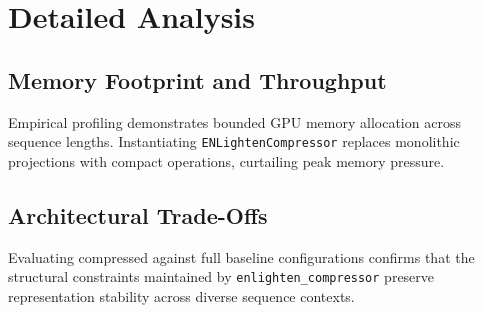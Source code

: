\section{Detailed Analysis}

\subsection{Memory Footprint and Throughput}
Empirical profiling demonstrates bounded GPU memory allocation across sequence lengths. Instantiating \texttt{ENLightenCompressor} replaces monolithic projections with compact operations, curtailing peak memory pressure.

\subsection{Architectural Trade-Offs}
Evaluating compressed against full baseline configurations confirms that the structural constraints maintained by \texttt{enlighten_compressor} preserve representation stability across diverse sequence contexts.
